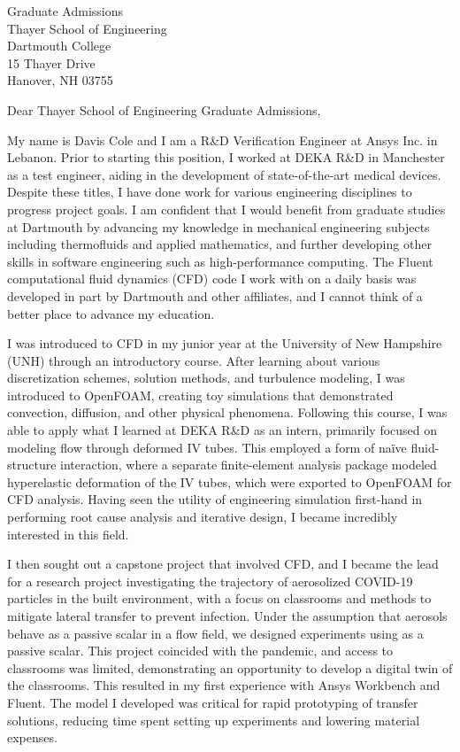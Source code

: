 \documentclass{letter}
\begin{document}
\begin{letter}{Graduate Admissions \\ Thayer School of Engineering \\ Dartmouth College \\ 15 Thayer Drive \\ Hanover, NH 03755}
    \opening{Dear Thayer School of Engineering Graduate Admissions,}

    My name is Davis Cole and I am a R\&D Verification Engineer at Ansys Inc. in Lebanon.
    Prior to starting this position, I worked at DEKA R\&D in Manchester as a test engineer, aiding in the development 
    of state-of-the-art medical devices. Despite these titles, I have done work for various engineering disciplines to 
    progress project goals. I am confident that I would benefit from graduate studies at Dartmouth by advancing my knowledge 
    in mechanical engineering subjects including thermofluids and applied mathematics, and further developing other skills 
    in software engineering such as high-performance computing. The Fluent computational fluid dynamics (CFD) code I work with on a 
    daily basis was developed in part by Dartmouth and other affiliates, and I cannot think of a better place to advance my education.

    I was introduced to CFD in my junior year at the University of New Hampshire (UNH) through an introductory course.
    After learning about various discretization schemes, solution methods, and turbulence modeling, I was introduced to OpenFOAM,
    creating toy simulations that demonstrated convection, diffusion, and other physical phenomena. Following this course,
    I was able to apply what I learned at DEKA R\&D as an intern, primarily focused on modeling flow through deformed IV tubes. 
    This employed a form of na\"ive fluid-structure interaction, where a separate finite-element analysis package modeled hyperelastic 
    deformation of the IV tubes, which were exported to OpenFOAM for CFD analysis. Having seen the utility of engineering 
    simulation first-hand in performing root cause analysis and iterative design, I became incredibly interested in this field.

    I then sought out a capstone project that involved CFD, and I became the lead for a research project investigating the trajectory 
    of aerosolized COVID-19 particles in the built environment, with a focus on classrooms and methods to mitigate lateral transfer to 
    prevent infection. Under the assumption that aerosols behave as a passive scalar in a flow field, we designed experiments using
     as a passive scalar. This project coincided with the pandemic, and access to classrooms was limited, demonstrating an 
    opportunity to develop a digital twin of the classrooms. This resulted in my first experience with Ansys Workbench and Fluent. 
    The model I developed was critical for rapid prototyping of transfer solutions, reducing time spent setting up experiments and 
    lowering material expenses.


\end{letter}
\end{document}
